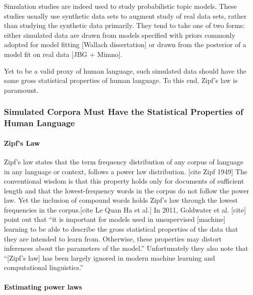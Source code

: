 \documentclass[conference,final,]{IEEEtran}
\begin{document}
Simulation studies are indeed used to study probabilistic topic models.
These studies usually use synthetic data sets to augment study of real
data sets, rather than studying the synthetic data primarily. They tend
to take one of two forms: either simulated data are drawn from models
specified with priors commonly adopted for model fitting {[}Wallach
dissertation{]} or drawn from the posterior of a model fit on real data
{[}JBG + Mimno{]}.

Yet to be a valid proxy of human language, such simulated data should
have the same gross statistical properties of human language. To this
end, Zipf's law is paramount.

\hypertarget{simulated-corpora-must-have-the-statistical-properties-of-human-language}{%
\subsubsection{Simulated Corpora Must Have the Statistical Properties of
Human
Language}\label{simulated-corpora-must-have-the-statistical-properties-of-human-language}}

\hypertarget{zipfs-law}{%
\paragraph{Zipf's Law}\label{zipfs-law}}

Zipf's law states that the term frequency distribution of any corpus of
language in any language or context, follows a power law distribution.
{[}cite Zipf 1949{]} The conventional wisdom is that this property holds
only for documents of sufficient length and that the lowest-frequency
words in the corpus do not follow the power law. Yet the inclusion of
compound words holds Zipf's law through the lowest frequencies in the
corpus.{[}cite Le Quan Ha et al.{]} In 2011, Goldwater et al. {[}cite{]}
point out that ``it is important for models used in unsupervised
{[}machine{]} learning to be able to describe the gross statistical
properties of the data that they are intended to learn from. Otherwise,
these properties may distort inferences about the parameters of the
model.'' Unfortunately they also note that ``{[}Zipf's law{]} has been
largely ignored in modern machine learning and computational
linguistics.''

\hypertarget{estimating-power-laws}{%
\paragraph{Estimating power laws}\label{estimating-power-laws}}
\end{document}

